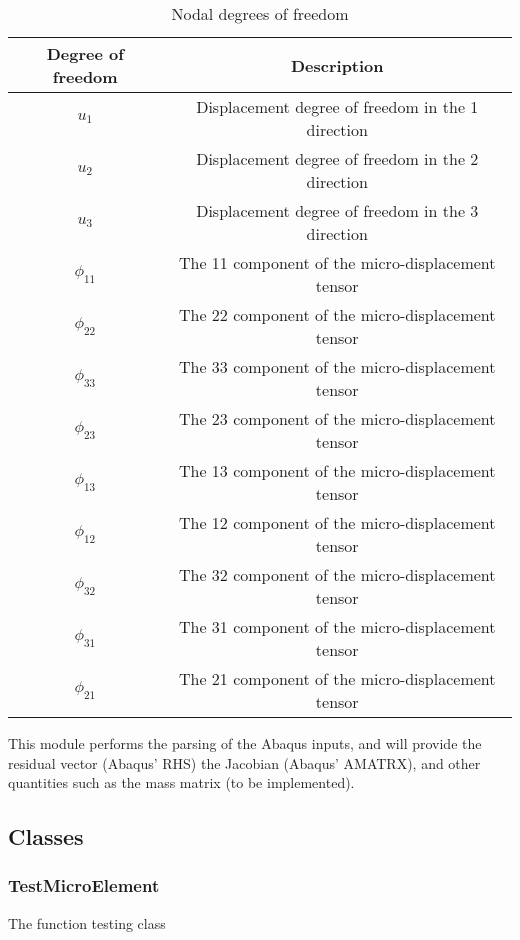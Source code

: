 \documentclass{asme2ej}
\begin{document}
\begin{table}
\centering
\begin{tabular}{c c}
\hline
Degree of freedom & Description \\
\hline
\hline
$u_1$ & Displacement degree of freedom in the 1 direction\\
$u_2$ & Displacement degree of freedom in the 2 direction\\
$u_3$ & Displacement degree of freedom in the 3 direction\\
$\phi_{11}$ & The 11 component of the micro-displacement tensor\\
$\phi_{22}$ & The 22 component of the micro-displacement tensor\\
$\phi_{33}$ & The 33 component of the micro-displacement tensor\\
$\phi_{23}$ & The 23 component of the micro-displacement tensor\\
$\phi_{13}$ & The 13 component of the micro-displacement tensor\\
$\phi_{12}$ & The 12 component of the micro-displacement tensor\\
$\phi_{32}$ & The 32 component of the micro-displacement tensor\\
$\phi_{31}$ & The 31 component of the micro-displacement tensor\\
$\phi_{21}$ & The 21 component of the micro-displacement tensor\\
\hline
\end{tabular}
\caption{Nodal degrees of freedom}
\label{table:nodal_dof}
\end{table}

This module performs the parsing of the Abaqus inputs, and will provide the residual vector (Abaqus' RHS) the Jacobian (Abaqus' AMATRX), and other quantities such as the mass matrix (to be implemented).

\subsection{Classes}

\subsubsection{TestMicroElement}

The function testing class
\end{document}
